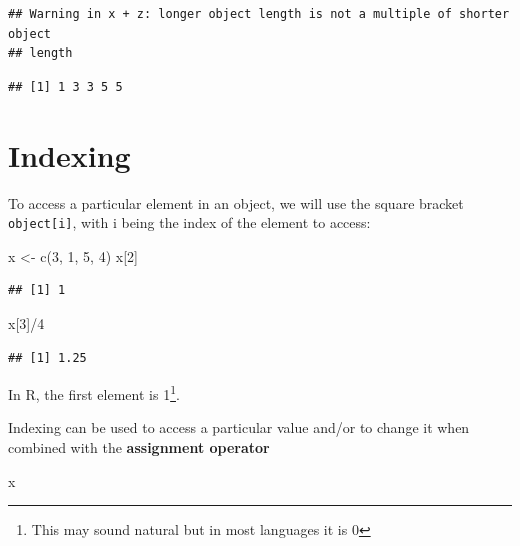 \documentclass[
]{book}
\newenvironment{Shaded}{\begin{snugshade}}{\end{snugshade}}
\newcommand{\DecValTok}[1]{\textcolor[rgb]{0.00,0.00,0.81}{#1}}
\newcommand{\FunctionTok}[1]{\textcolor[rgb]{0.00,0.00,0.00}{#1}}
\newcommand{\NormalTok}[1]{#1}
\newcommand{\OtherTok}[1]{\textcolor[rgb]{0.56,0.35,0.01}{#1}}
\newcommand{\SpecialCharTok}[1]{\textcolor[rgb]{0.00,0.00,0.00}{#1}}
\begin{document}
\begin{verbatim}
## Warning in x + z: longer object length is not a multiple of shorter object
## length
\end{verbatim}

\begin{verbatim}
## [1] 1 3 3 5 5
\end{verbatim}

\hypertarget{indexing}{%
\section{Indexing}\label{indexing}}

To access a particular element in an object, we will use the square bracket \texttt{object{[}i{]}}, with i being the index of the element to access:

\begin{Shaded}
\begin{Highlighting}[]
\NormalTok{x }\OtherTok{\textless{}{-}} \FunctionTok{c}\NormalTok{(}\DecValTok{3}\NormalTok{, }\DecValTok{1}\NormalTok{, }\DecValTok{5}\NormalTok{, }\DecValTok{4}\NormalTok{)}
\NormalTok{x[}\DecValTok{2}\NormalTok{]}
\end{Highlighting}
\end{Shaded}

\begin{verbatim}
## [1] 1
\end{verbatim}

\begin{Shaded}
\begin{Highlighting}[]
\NormalTok{x[}\DecValTok{3}\NormalTok{]}\SpecialCharTok{/}\DecValTok{4}
\end{Highlighting}
\end{Shaded}

\begin{verbatim}
## [1] 1.25
\end{verbatim}

In R, the first element is 1\footnote{This may sound natural but in most languages it is 0}.

Indexing can be used to access a particular value and/or to change it when combined with the \textbf{assignment operator}

\begin{Shaded}
\begin{Highlighting}[]
\NormalTok{x}
\end{Highlighting}
\end{Shaded}
\end{document}
